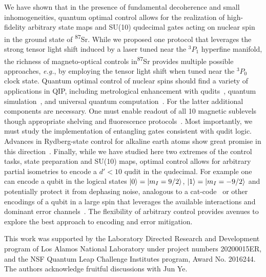 \documentclass[aps,prl,twocolumn,reprint,superscriptaddress,footinbib]{revtex4-2}
\begin{document}
We have shown that in the presence of fundamental decoherence and small inhomogeneities, quantum optimal control allows for the realization of high-fidelity arbitrary state maps and SU(10) qudecimal gates acting on nuclear spin in the ground state of \textsuperscript{87}Sr. While we proposed one protocol that leverages the strong tensor light shift induced by a laser tuned near the $^3P_1$ hyperfine manifold, the richness of magneto-optical controls in\textsuperscript{87}Sr provides multiple possible approaches, \textit{e.g.}, by employing the tensor light shift when tuned near the $^3P_0$ clock state.  Quantum optimal control of nuclear spins should find a variety of applications in QIP, including metrological enhancement with qudits~\cite{Noris2012}, quantum simulation~\cite{Poggi2020,Blok2021}, and universal quantum computation~\cite{daley2011quantum}. For the latter additional components are necessary. One must enable readout of all 10 magnetic sublevels though appropriate shelving and fluorescence protocols~\cite{boyd2007nuclear}. Most importantly, we must study the implementation of entangling gates consistent with qudit logic.  Advances in Rydberg-state control for alkaline earth atoms show great promise in this direction~\cite{madjarov2020high}.  Finally, while we have studied here two extremes of the control tasks, state preparation and SU(10) maps, optimal control allows for arbitrary partial isometries to encode a $d'<10$ qudit in the qudecimal.  For example one can encode a qubit in the logical states $\ket{0}=\ket{m_I=9/2}$, $\ket{1}=\ket{m_I=-9/2}$ and potentially protect it from dephasing noise, analogous to a cat-code~\cite{Li2017} or other encodings of a qubit in a large spin that leverages the available interactions and dominant error channels~\cite{Gross2021}.  The flexibility of arbitrary control provides avenues to explore the best approach to encoding and error mitigation. 

\begin{acknowledgements}

This work was supported by the Laboratory Directed Research and Development program of Los Alamos National Laboratory under project numbers 20200015ER,  
and the NSF Quantum Leap Challenge Institutes program, Award No. 2016244. The authors acknowledge fruitful discussions with Jun Ye.
\end{acknowledgements}


\end{document}
